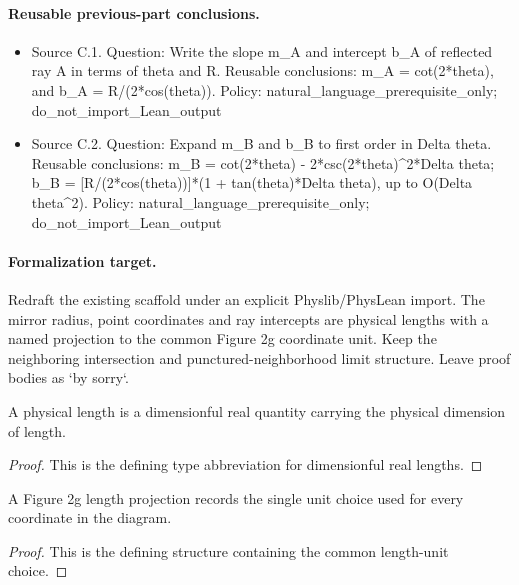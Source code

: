 \paragraph{Reusable previous-part conclusions.}
\begin{itemize}
\item Source C.1. Question: Write the slope m\_A and intercept b\_A of reflected ray A in terms of theta and R. Reusable conclusions: m\_A = cot(2*theta), and b\_A = R/(2*cos(theta)). Policy: natural\_language\_prerequisite\_only; do\_not\_import\_Lean\_output
\item Source C.2. Question: Expand m\_B and b\_B to first order in Delta theta. Reusable conclusions: m\_B = cot(2*theta) - 2*csc(2*theta)\textasciicircum{}2*Delta theta; b\_B = [R/(2*cos(theta))]*(1 + tan(theta)*Delta theta), up to O(Delta theta\textasciicircum{}2). Policy: natural\_language\_prerequisite\_only; do\_not\_import\_Lean\_output
\end{itemize}

\paragraph{Formalization target.}
Redraft the existing scaffold under an explicit Physlib/PhysLean import.  The
mirror radius, point coordinates and ray intercepts are physical lengths with a
named projection to the common Figure 2g coordinate unit.  Keep the neighboring
intersection and punctured-neighborhood limit structure.  Leave proof bodies as
`by sorry`.

\begin{definition}[PhysicalLength]
  \label{decl:physics:IPhO_2026_2_C_3:PhysicalLength}
  A physical length is a dimensionful real quantity carrying the physical
  dimension of length.
\end{definition}
\begin{proof}
  This is the defining type abbreviation for dimensionful real lengths.
\end{proof}

\begin{definition}
  \label{decl:physics:IPhO_2026_2_C_3:Figure2gLengthProjection}
  A Figure 2g length projection records the single unit choice used for every
  coordinate in the diagram.
\end{definition}
\begin{proof}
  This is the defining structure containing the common length-unit choice.
\end{proof}

